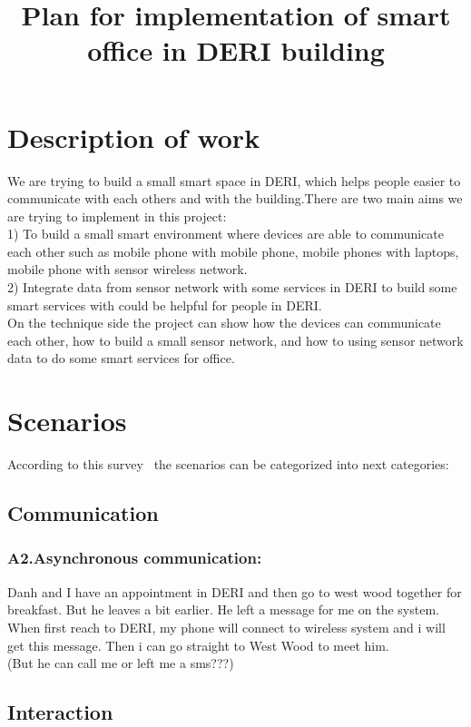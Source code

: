\documentclass[a4paper]{llncs}
\begin{document}
\title{Plan for implementation of smart office in DERI building}
\maketitle
\section{Description of work}
We are trying to build a small smart space in DERI, which helps people easier to communicate with each others and with the building.There are two main aims we are trying to implement in this project:\\
1) To build a small smart environment where devices are able to communicate each other such as mobile phone with mobile phone, mobile phones with laptops, mobile phone with sensor wireless network.\\
2) Integrate data from sensor network with some services in DERI to build some smart services with could be helpful for people in DERI.\\

On the technique side the project can show how the devices can communicate each other, how to build a small sensor network, and how to using sensor network data to do some smart services for office.

\section{Scenarios}
According to this survey~\cite{survey:2010} the scenarios can be categorized into next categories:

\subsection{Communication}
\subsubsection{A2.Asynchronous communication: }
Danh and I have an appointment in DERI and then go to west wood together for breakfast. But he leaves a bit earlier. He left a message for me on the system. When first reach to DERI, my phone will connect to wireless system and i will get this message. Then i can go straight to West Wood to meet him.\\
(But he can call me or left me a sms???)
\subsection{Interaction}
\end{document}
